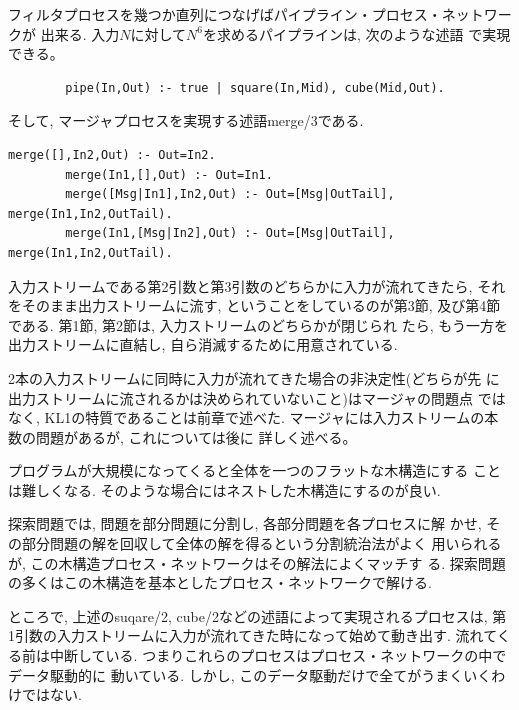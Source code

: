 \documentclass[a4,titlepage]{jsreport}
\newenvironment{program}{\begin{quote}}{\end{quote}}
\begin{document}
フィルタプロセスを幾つか直列につなげばパイプライン・プロセス・ネットワークが
出来る.  入力$N$に対して$N^{6}$を求めるパイプラインは, 次のような述語
で実現できる。

\begin{verbatim}
        pipe(In,Out) :- true | square(In,Mid), cube(Mid,Out).
\end{verbatim}

そして, マージャプロセスを実現する述語merge/3である.  

\begin{Verbatim}[baselinestretch=0.8]
        merge([],In2,Out) :- Out=In2.
        merge(In1,[],Out) :- Out=In1.
        merge([Msg|In1],In2,Out) :- Out=[Msg|OutTail], merge(In1,In2,OutTail).
        merge(In1,[Msg|In2],Out) :- Out=[Msg|OutTail], merge(In1,In2,OutTail).
\end{Verbatim}

入力ストリームである第2引数と第3引数のどちらかに入力が流れてきたら, 
それをそのまま出力ストリームに流す, ということをしているのが第3節, 
及び第4節である.  
第1節, 第2節は, 入力ストリームのどちらかが閉じられ
たら, もう一方を出力ストリームに直結し, 
自ら消滅するために用意されている.  

2本の入力ストリームに同時に入力が流れてきた場合の非決定性(どちらが先
に出力ストリームに流されるかは決められていないこと)はマージャの問題点
ではなく, KL1の特質であることは前章で述べた.  
マージャには入力ストリームの本数の問題があるが, これについては後に
詳しく述べる。

プログラムが大規模になってくると全体を一つのフラットな木構造にする
ことは難しくなる.  そのような場合にはネストした木構造にするのが良い.  

探索問題では, 問題を部分問題に分割し, 各部分問題を各プロセスに解
かせ, その部分問題の解を回収して全体の解を得るという分割統治法がよく
用いられるが, この木構造プロセス・ネットワークはその解法によくマッチす
る.  探索問題の多くはこの木構造を基本としたプロセス・ネットワークで解ける.  

ところで, 上述のsuqare/2, cube/2などの述語によって実現されるプロセスは, 
第1引数の入力ストリームに入力が流れてきた時になって始めて動き出す.  
流れてくる前は中断している.  
つまりこれらのプロセスはプロセス・ネットワークの中でデータ駆動的に
動いている.  しかし, このデータ駆動だけで全てがうまくいくわけではない.  
\end{document}
